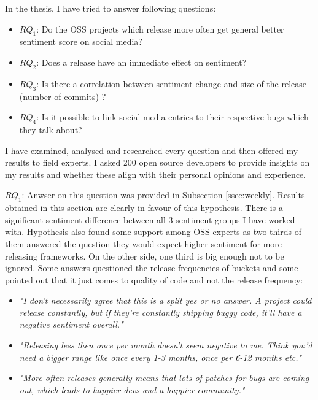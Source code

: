 
In the thesis, I have tried to answer following questions:
\begin{itemize}
\item{\textbf{$RQ_{1}$}: Do the OSS projects which release more often get general better sentiment score on social media?}
\item{\textbf{$RQ_{2}$}: Does a release have an immediate effect on sentiment?}
\item{\textbf{$RQ_{3}$}: Is there a correlation between sentiment change and size of the release (number of commits) ?}
\item{\textbf{$RQ_{4}$}: Is it possible to link social media entries to their respective bugs which they talk about?}
\end{itemize}

I have examined, analysed and researched every question and then offered my results to field experts. I asked 200 open source developers to provide insights on my results and whether these align with their personal opinions and experience.

\textbf{$RQ_{1}$}: Anwser on this question was provided in Subsection  \ref{ssec:weekly}. Results obtained in this section are clearly in favour of this hypothesis. There is a significant sentiment difference between all 3 sentiment groups I have worked with. Hypothesis also found some support among OSS experts as two thirds of them answered the question they would expect higher sentiment for more releasing frameworks. On the other side, one third is big enough not to be ignored. Some answers questioned the release frequencies of buckets and some pointed out that it just comes to quality of code and not the release frequency:

\begin{itemize}
\item \textit{"I don't necessarily agree that this is a split yes or no answer. A project could release constantly, but if they're constantly shipping buggy code, it'll have a negative sentiment overall."}
\item \textit{"Releasing less then once per month doesn't seem negative to me. Think you'd need a bigger range like once every 1-3 months, once per 6-12 months etc."}
\item \textit{"More often releases generally means that lots of patches for bugs are coming out, which leads to happier devs and a happier community."}
\end{itemize}

